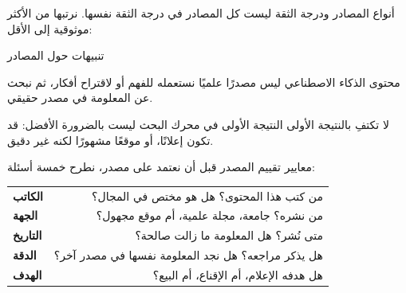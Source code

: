 \documentclass[aspectratio=169, 11pt, xcolor={table}]{beamer}
\begin{document}
\begin{frame}{أنواع المصادر ودرجة الثقة}
    ليست كل المصادر في درجة الثقة نفسها. نرتبها من الأكثر موثوقية إلى الأقل:
    \begin{center}
    \end{center}
\end{frame}

\begin{frame}{تنبيهات حول المصادر}
    \begin{obox}{\faExclamationTriangle\quad محتوى الذكاء الاصطناعي ليس مصدرًا علميًا}
        نستعمله للفهم أو لاقتراح أفكار، ثم نبحث عن المعلومة في مصدر حقيقي.
    \end{obox}
    \begin{obox}{\faExclamationTriangle\quad لا تكتفِ بالنتيجة الأولى}
        النتيجة الأولى في محرك البحث ليست بالضرورة الأفضل:
        قد تكون إعلانًا، أو موقعًا مشهورًا لكنه غير دقيق.
    \end{obox}
\end{frame}

\begin{frame}{معايير تقييم المصدر}
    قبل أن نعتمد على مصدر، نطرح خمسة أسئلة:
    \begin{center}
    \begin{tabularx}{\textwidth}{|>{\centering\arraybackslash}p{2.6cm}|R|}
        \hline
         &  \\ \hline
        \textbf{الكاتب}  & من كتب هذا المحتوى؟ هل هو مختص في المجال؟ \\ \hline
        \textbf{الجهة}   & من نشره؟ جامعة، مجلة علمية، أم موقع مجهول؟ \\ \hline
        \textbf{التاريخ} & متى نُشر؟ هل المعلومة ما زالت صالحة؟ \\ \hline
        \textbf{الدقة}   & هل يذكر مراجعه؟ هل نجد المعلومة نفسها في مصدر آخر؟ \\ \hline
        \textbf{الهدف}   & هل هدفه الإعلام، أم الإقناع، أم البيع؟ \\ \hline
    \end{tabularx}
    \end{center}
\end{frame}
\end{document}
